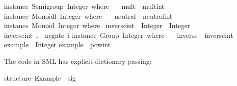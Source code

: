 \begin{isabellebody}
\begin{isamarkuptext}
\isanewline
instance\ Semigroup\ Integer\ where\ {}\isanewline
\ \ mult\ {}\ mult{}int{}\isanewline
{}{}\isanewline
\isanewline
instance\ Monoidl\ Integer\ where\ {}\isanewline
\ \ neutral\ {}\ neutral{}int{}\isanewline
{}{}\isanewline
\isanewline
instance\ Monoid\ Integer\ where\ {}\isanewline
{}{}\isanewline
\isanewline
inverse{}int\ {}{}\ Integer\ {}{}\ Integer{}\isanewline
inverse{}int\ i\ {}\ negate\ i{}\isanewline
\isanewline
instance\ Group\ Integer\ where\ {}\isanewline
\ \ inverse\ {}\ inverse{}int{}\isanewline
{}{}\isanewline
\isanewline
example\ {}{}\ Integer{}\isanewline
example\ {}\ pow{}int\ {}{}\ {}{}{}{}{}\isanewline
\isanewline
{}\isanewline%
\end{isamarkuptext}%
\isamarkuptrue%
%
\endisatagquotetypewriter
{\isafoldquotetypewriter}%
%
\isadelimquotetypewriter
%
\endisadelimquotetypewriter
%
\begin{isamarkuptext}%
\noindent The code in SML has explicit dictionary passing:%
\end{isamarkuptext}%
\isamarkuptrue%
%
\isadelimquotetypewriter
%
\endisadelimquotetypewriter
%
\isatagquotetypewriter
%
\begin{isamarkuptext}%
structure\ Example\ {}\ sig\isanewline

\end{isamarkuptext}
\end{isabellebody}
